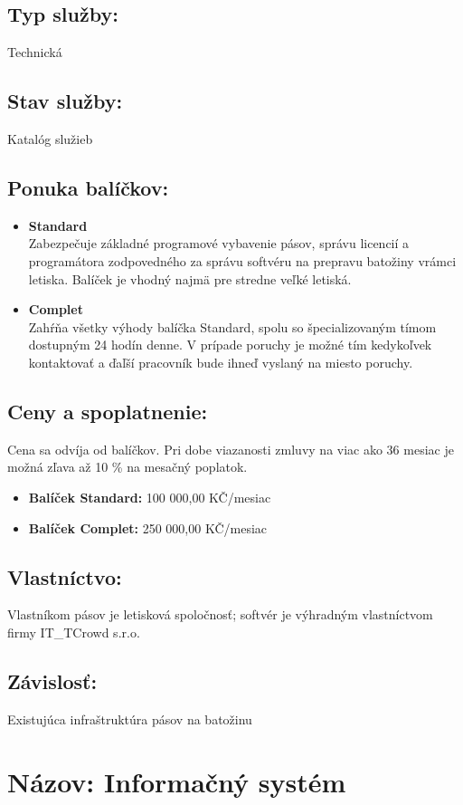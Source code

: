 \documentclass[a4paper, 11pt]{article}
\begin{document}
\subsection*{Typ služby:} Technická
\subsection*{Stav služby:} Katalóg služieb
\subsection*{Ponuka balíčkov:}
\begin{itemize}
\item \textbf{Standard} \\
Zabezpečuje základné programové vybavenie pásov, správu licencií a programátora zodpovedného za správu softvéru na prepravu batožiny vrámci letiska. Balíček je vhodný najmä pre stredne veľké letiská.
\item \textbf{Complet} \\
Zahŕňa všetky výhody balíčka Standard, spolu so špecializovaným tímom dostupným 24 hodín denne. V prípade poruchy je možné tím kedykoľvek kontaktovať a ďaľší pracovník bude ihneď vyslaný na miesto poruchy.
\end{itemize}
\subsection*{Ceny a spoplatnenie:}
Cena sa odvíja od balíčkov. Pri dobe viazanosti zmluvy na viac ako 36 mesiac je možná zľava až 10 \% na mesačný poplatok.
\begin{itemize}
\item \textbf{Balíček Standard:} 100 000,00 KČ/mesiac
\item \textbf{Balíček Complet:} 250 000,00 KČ/mesiac
\end{itemize}
\subsection*{Vlastníctvo:}
Vlastníkom pásov je letisková spoločnosť; softvér je výhradným vlastníctvom firmy IT\_TCrowd s.r.o.
\subsection*{Závislosť:}
Existujúca infraštruktúra pásov na batožinu


\section*{Názov: Informačný systém}
\end{document}
